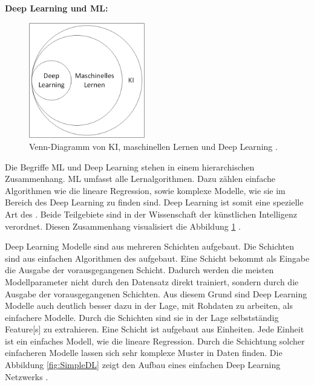 {\raggedright\textbf{\gls{Deep Learning} und \gls{ML}:}\\}
\begin{figure}
    \begin{center}
        \vspace*{-9mm}
        \includegraphics[width=0.45\textwidth]{img/Grafiken/Ki-ML und Deep Learning Ven.png}
        \vspace*{-10mm}
        \caption[Venn-Diagramm von KI, maschinellen Lernen und Deep Learning.]{Venn-Diagramm von KI, maschinellen Lernen und Deep Learning \cite{Goodfellow.2016}.}
        \label{fig:zusammenhangDL_ML}
    \end{center}
\end{figure}
Die Begriffe \gls{ML} und \gls{Deep Learning} stehen in einem hierarchischen Zusammenhang. \Gls{ML} umfasst alle Lernalgorithmen. Dazu zählen einfache Algorithmen wie die lineare Regression, sowie komplexe Modelle, wie sie im Bereich des \gls{Deep Learning} zu finden sind. \gls{Deep Learning} ist somit eine spezielle Art des . Beide Teilgebiete sind in der Wissenschaft der künstlichen Intelligenz verordnet. Diesen Zusammenhang visualisiert die Abbildung \ref{fig:zusammenhangDL_ML} \cite{Goodfellow.2016, Burkov.2019}.

\gls{Deep Learning} Modelle sind aus mehreren Schichten aufgebaut. Die Schichten sind aus einfachen Algorithmen des  aufgebaut. Eine Schicht bekommt als Eingabe die Ausgabe der vorausgegangenen Schicht. Dadurch werden die meisten Modellparameter nicht durch den Datensatz direkt trainiert, sondern durch die Ausgabe der vorausgegangenen Schichten. Aus diesem Grund sind \gls{Deep Learning} Modelle auch deutlich besser dazu in der Lage, mit Rohdaten zu arbeiten, als einfachere Modelle. Durch die Schichten sind sie in der Lage selbstständig \gls{Feature}[s] zu extrahieren. Eine Schicht ist aufgebaut aus Einheiten. Jede Einheit ist ein einfaches Modell, wie die lineare Regression. Durch die Schichtung solcher einfacheren Modelle lassen sich sehr komplexe Muster in Daten finden. Die Abbildung \ref{fig:SimpleDL} zeigt den Aufbau eines einfachen \gls{Deep Learning} Netzwerks \cite{Burkov.2019, Goodfellow.2016}. 

